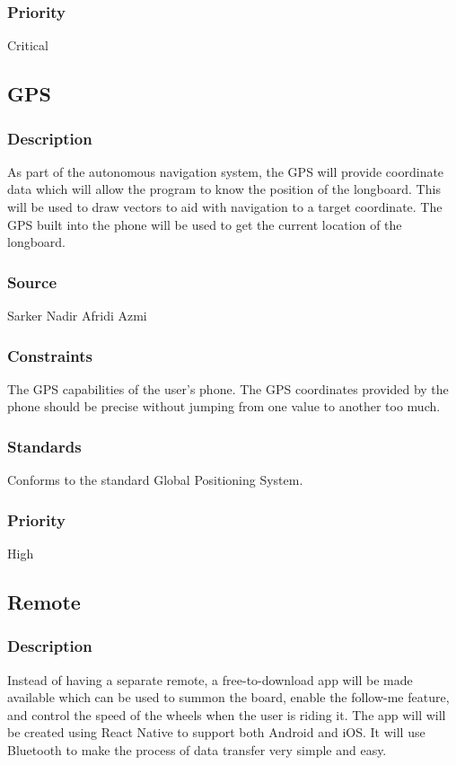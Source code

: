 \subsubsection{Priority}
Critical

\subsection{GPS}
\subsubsection{Description}
As part of the autonomous navigation system, the GPS will provide coordinate data which will allow the program to know the position of the longboard. This will be used to draw vectors to aid with navigation to a target coordinate. The GPS built into the phone will be used to get the current location of the longboard.
\subsubsection{Source}
Sarker Nadir Afridi Azmi
\subsubsection{Constraints}
The GPS capabilities of the user's phone. The GPS coordinates provided by the phone should be precise without jumping from one value to another too much.
\subsubsection{Standards}
Conforms to the standard Global Positioning System.
\subsubsection{Priority}
High

\subsection{Remote}
\subsubsection{Description}
Instead of having a separate remote, a free-to-download app will be made available which can be used to summon the board, enable the follow-me feature, and control the speed of the wheels when the user is riding it. The app will will be created using React Native to support both Android and iOS. It will use Bluetooth to make the process of data transfer very simple and easy.
